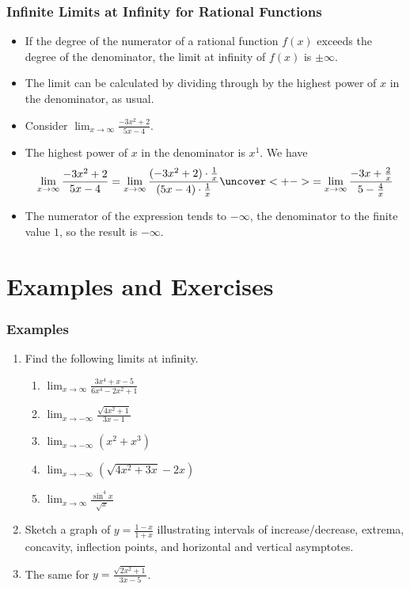 \documentclass[serif,ignorenonframetext]{beamer}
\newcommand{\ds}{\displaystyle}
\begin{document}
\begin{frame}
  \frametitle{Infinite Limits at Infinity for Rational Functions}
  \begin{itemize}[<+->]
  \item If the degree of the numerator of a rational function $f(x)$
    exceeds the degree of the denominator, the limit at infinity of
    $f(x)$ is $\pm\infty$.
  \item The limit can be calculated by dividing through by the highest
    power of $x$ in the denominator, as usual.
  \item Consider $\ds\lim_{x\to\infty} \frac{-3x^2+2}{5x-4}$.
  \item The highest power of $x$ in the denominator is $x^1$.  We have
    \begin{align*}
      \lim_{x\to\infty} \frac{-3x^2+2}{5x-4}
      = \lim_{x\to\infty} 
        \frac{(-3x^2+2)\cdot\frac{1}{x}}{(5x-4)\cdot\frac{1}{x}}
      \uncover<+->{= \lim_{x\to\infty} \frac{-3x+\frac{2}{x}}{5-\frac{4}{x}}}%
    \end{align*}
  \item The numerator of the expression tends to $-\infty$, the denominator
    to the finite value $1$, so the result is $-\infty$.
  \end{itemize}
\end{frame}


\section{Examples and Exercises}

\begin{frame}
  \frametitle{Examples}
  \begin{enumerate}
  \item Find the following limits at infinity.
    \begin{enumerate}
    \item $\ds \lim_{x\to\infty} \frac{3x^4+x-5}{6x^4-2x^2+1}$
    \item $\ds \lim_{x\to-\infty} \frac{\sqrt{4x^2+1}}{3x-1}$
    \item $\ds \lim_{x\to-\infty} (x^2+x^3)$
    \item $\ds \lim_{x\to-\infty} \left(\sqrt{4x^2+3x}-2x\right)$
    \item $\ds \lim_{x\to\infty} \frac{\sin^4 x}{\sqrt{x}}$
    \end{enumerate}
  \item Sketch a graph of $\ds y=\frac{1-x}{1+x}$ illustrating
    intervals of increase/decrease, extrema, concavity, inflection points,
    and horizontal and vertical asymptotes.
  \item The same for $\ds y=\frac{\sqrt{2x^2+1}}{3x-5}$.
  \end{enumerate} 
\end{frame}
\end{document}
